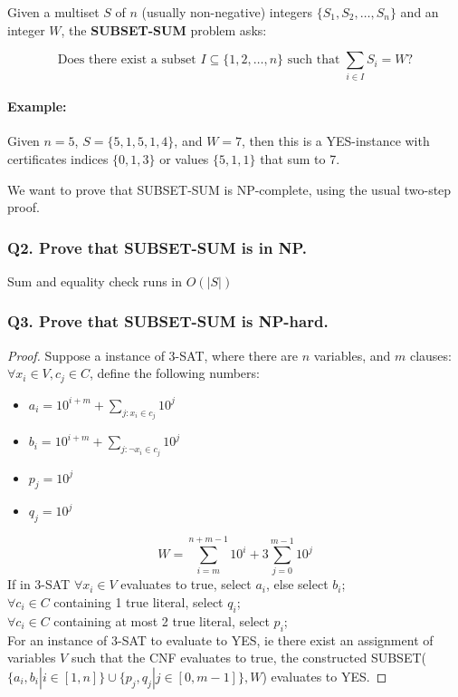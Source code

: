 \documentclass[9pt]{extarticle}
\begin{document}
Given a multiset $S$ of $n$ (usually non-negative) integers $\{S_1, S_2, \dots, S_n\}$ and an integer $W$, the \textbf{SUBSET-SUM} problem asks:

\[
\text{Does there exist a subset } I \subseteq \{1, 2, \dots, n\} \text{ such that } \sum_{i \in I} S_i = W?
\]

\paragraph{Example:}  
Given $n = 5$, $S = \{5, 1, 5, 1, 4\}$, and $W = 7$, then this is a YES-instance with certificates  
indices $\{0, 1, 3\}$ or values $\{5, 1, 1\}$ that sum to 7.

We want to prove that SUBSET-SUM is NP-complete, using the usual two-step proof.

\subsubsection*{Q2. Prove that SUBSET-SUM is in NP.}
Sum and equality check runs in $O(|S|)$
\subsubsection*{Q3. Prove that SUBSET-SUM is NP-hard.}
\begin{proof}
  Suppose a instance of 3-SAT, where there are $n$ variables, and $m$ clauses:\\
  $\forall x_i \in V, c_j \in C$, define the following numbers:
  \begin{itemize}
    \item $a_i = 10^{i + m} + \sum_{j: x_i \in c_j} 10^j$
    \item $b_i = 10^{i + m} + \sum_{j: \neg x_i \in c_j} 10^j$
    \item $p_j = 10^j$
    \item $q_j = 10^j$
  \end{itemize}
  \[W = \sum_{i=m}^{n+m-1} 10^i + 3\sum_{j=0}^{m-1} 10^j\]
  If in 3-SAT $\forall x_i \in V$ evaluates to true, select $a_i$, else select $b_i$;\\
  $\forall c_i \in C$ containing 1 true literal, select $q_i$;\\
  $\forall c_i \in C$ containing at most 2 true literal, select $p_i$;\\
  For an instance of 3-SAT to evaluate to YES, ie there exist an assignment of variables $V$ such that the CNF evaluates to true,
  the constructed SUBSET($\{a_i, b_i | i \in [1, n]\} \cup \{p_j, q_j | j \in [0, m-1]\}, W$) evaluates to YES.
\end{proof}
\end{document}
